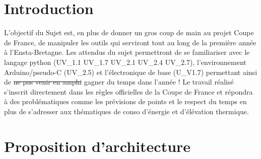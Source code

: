 \documentclass[fleqn,10pt]{SelfArx} %
\begin{document}
\flushbottom %

\maketitle %

\tableofcontents %

\thispagestyle{empty} %


\section*{Introduction} %


L'objectif du Sujet est, en plus de donner un gros coup de main au projet Coupe de France, de manipuler les outils qui serviront tout au long de la première année à l'Ensta-Bretagne. Les attendus du sujet permettront de se familiariser avec le langage python (UV\_1.1 UV\_1.7 UV\_2.1 UV\_2.4 UV\_2.7), l'environnement Arduino/pseudo-C (UV\_2.5) et l'électronique de base (U\_V1.7) permettant ainsi de \st{ ne pas venir en amphi} gagner du temps dans l'année ! Le travail réalisé s'inscrit directement dans les règles officielles de la Coupe de France et répondra à des problématiques comme les prévisions de points et le respect du temps en plus de s'adresser aux thématiques de conso d'énergie et d'élévation thermique.


\section{Proposition d'architecture}
\end{document}
